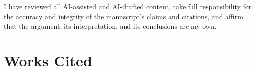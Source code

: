 \documentclass[12pt, a4paper]{article}
\begin{document}
I have reviewed all AI-assisted and AI-drafted content, take full responsibility for the
accuracy and integrity of the manuscript's claims and citations, and affirm that the
argument, its interpretation, and its conclusions are my own.

\section*{Works Cited}

\end{document}
